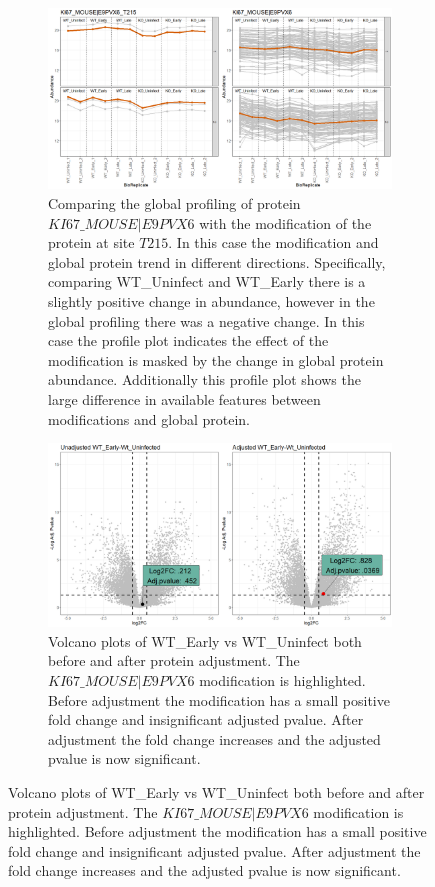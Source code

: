 \documentclass{mcp}
\begin{document}
\begin{figure}[h!]
\centering
 \begin{subfigure}{\textwidth}
	\includegraphics[width=\textwidth]{sim_new/Difference_Shigella_Profile_Plot}
	\caption{Comparing the global profiling of protein $KI67\_MOUSE|E9PVX6$ with the modification of the protein at site $T215$. In this case the modification and global protein trend in different directions. Specifically, comparing WT\_Uninfect and WT\_Early there is a slightly positive change in abundance, however in the global profiling there was a negative change. In this case the profile plot indicates the effect of the modification is masked by the change in global protein abundance. Additionally this profile plot shows the large difference in available features between modifications and global protein.}
 \end{subfigure}
 \begin{subfigure}{\textwidth}
	\includegraphics[width=\textwidth]{sim_new/Difference_Shigella_Volcano}
	\caption{Volcano plots of WT\_Early vs WT\_Uninfect both before and after protein adjustment. The $KI67\_MOUSE|E9PVX6$ modification is highlighted. Before adjustment the modification has a small positive fold change and insignificant adjusted pvalue. After adjustment the fold change increases and the adjusted pvalue is now significant.}
 \end{subfigure}
\label{fig:Diff_Shigella_PTM}
\end{figure}
\end{document}
